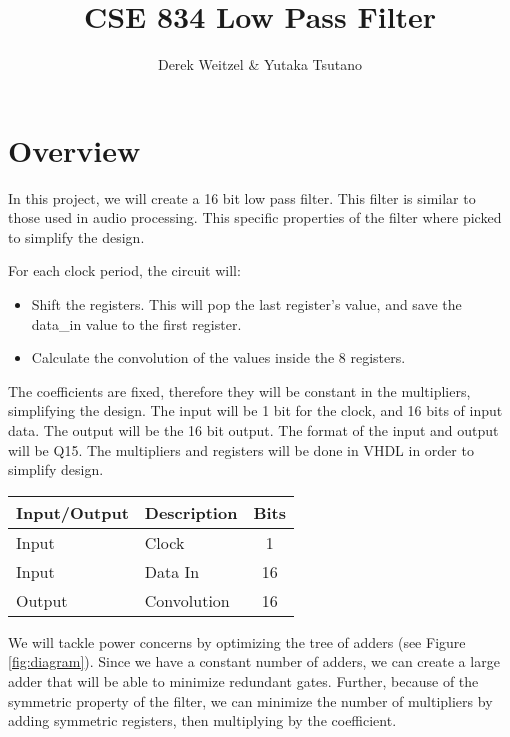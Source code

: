 \documentclass[12pt]{article}
\title{CSE 834 Low Pass Filter}
\author{Derek Weitzel \& Yutaka Tsutano}
\begin{document}
\maketitle










\section{Overview}
In this project, we will create a 16 bit low pass filter.  This filter is similar to those used in audio processing.  This specific properties of the filter where picked to simplify the design.

For each clock period, the circuit will:
\begin{itemize}
\item Shift the registers.  This will pop the last register's value, and save the data\_in value to the first register.
\item Calculate the convolution of the values inside the 8 registers.
\end{itemize}

The coefficients are fixed, therefore they will be constant in the multipliers, simplifying the design.  The input will be 1 bit for the clock, and 16 bits of input data.  The output will be the 16 bit output.  The format of the input and output will be Q15.  The multipliers  and registers will be done in VHDL in order to simplify design.

\begin{table}[ht]
\centering
\begin{tabular}{l | l | c}
\hline
Input/Output & Description & Bits \\
\hline \hline
Input & Clock & 1 \\
Input & Data In & 16 \\
Output & Convolution & 16 \\
\end{tabular}
\end{table}

We will tackle power concerns by optimizing the tree of adders (see Figure \ref{fig:diagram}).  Since we have a constant number of adders, we can create a large adder that will be able to minimize redundant gates.  Further, because of the symmetric property of the filter, we can minimize the number of multipliers by adding symmetric registers, then multiplying by the coefficient.  
\end{document}

